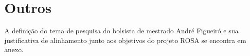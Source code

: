

\section{Outros}
\label{outros}

A definição do tema de pesquisa do bolsista de mestrado André Figueiró e sua justificativa de alinhamento junto aos objetivos do projeto ROSA se encontra em anexo. 